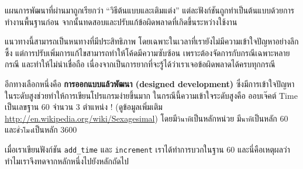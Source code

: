 
แผนการพัฒนาที่ผ่านมาถูกเรียกว่า ``วิธีต้นแบบและเติมแต่ง'' แต่ละฟังก์ชันถูกทำเป็นต้นแบบด้วยการทำงานพื้นฐานก่อน จากนั้นทดสอบและปรับแก้ข้อผิดพลาดที่เกิดขึ้นระหว่างใช้งาน


แนวทางนี้สามารถเป็นหนทางที่มีประสิทธิภาพ โดยเฉพาะในเวลาที่เรายังไม่มีความเข้าใจปัญหาอย่างลึกซึ้ง 
แต่การปรับเพิ่มการแก้ไขสามารถทำให้โค้ดมีความซับซ้อน เพราะต้องจัดการกับกรณีเฉพาะหลายกรณี และทำให้ไม่น่าเชื่อถือ 
เนื่องจากเป็นการยากที่จะรู้ได้ว่าเราเจอข้อผิดพลาดได้ครบทุกกรณี



อีกทางเลือกหนึ่งคือ {\bf การออกแบบแล้วพัฒนา (designed development)} ซึ่งมีการเข้าใจปัญหาในระดับสูงช่วยทำให้การเขียนโปรแกรมง่ายขึ้นมาก 
ในกรณีนี้ความเข้าใจระดับสูงคือ ออบเจ๊คต์ Time เป็นเลขฐาน 60 จำนวน 3 ตำแหน่ง !
(ดูข้อมูลเพิ่มเติม \url{http://en.wikipedia.org/wiki/Sexagesimal}) โดยมี{\tt วินาที}เป็นหลักหน่วย มี{\tt นาที}เป็นหลัก 60 และ{\tt ชั่วโมง}เป็นหลัก 3600


เมื่อเราเขียนฟังก์ชัน \verb"add_time" และ {\tt increment} เราได้ทำการบวกในฐาน 60 
และนี่คือเหตุผลว่าทำไมเราจึงทดจากหลักหนึ่งไปยังหลักถัดไป


